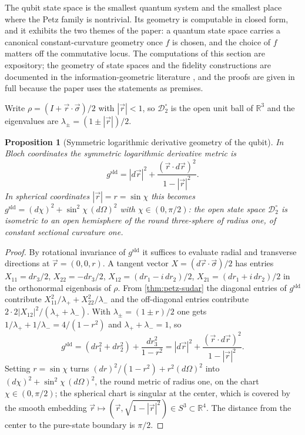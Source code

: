 \documentclass[11pt,letterpaper]{article}
\newtheorem{proposition}[theorem]{Proposition}
\theoremstyle{definition}
\theoremstyle{remark}
\begin{document}
The qubit state space is the smallest quantum system and the smallest place where the Petz family is nontrivial. Its geometry is computable in closed form, and it exhibits the two themes of the paper: a quantum state space carries a canonical constant-curvature geometry once $f$ is chosen, and the choice of $f$ matters off the commutative locus. The computations of this section are expository; the geometry of state spaces and the fidelity constructions are documented in the information-geometric literature \cite{hubner, braunstein-caves, petz-1996}, and the proofs are given in full because the paper uses the statements as premises.

Write $\rho = (I + \vec{r} \cdot \vec{\sigma})/2$ with $|\vec{r}| < 1$, so $\mathcal{D}_2^{\circ}$ is the open unit ball of $\mathbb{R}^3$ and the eigenvalues are $\lambda_{\pm} = (1 \pm |\vec{r}|)/2$.

\begin{proposition}[Symmetric logarithmic derivative geometry of the qubit]
\label{prop:qubit-sld}
In Bloch coordinates the symmetric logarithmic derivative metric is
\begin{equation}
\label{eq:qubit-sld}
g^{\mathrm{sld}} = |d\vec{r}|^2 + \frac{(\vec{r} \cdot d\vec{r})^2}{1 - |\vec{r}|^2}.
\end{equation}
In spherical coordinates $|\vec{r}| = r = \sin\chi$ this becomes $g^{\mathrm{sld}} = (d\chi)^2 + \sin^2\!\chi \, (d\Omega)^2$ with $\chi \in (0, \pi/2)$: the open state space $\mathcal{D}_2^{\circ}$ is isometric to an open hemisphere of the round three-sphere of radius one, of constant sectional curvature one.
\end{proposition}

\begin{proof}
By rotational invariance of $g^{\mathrm{sld}}$ it suffices to evaluate radial and transverse directions at $\vec{r} = (0, 0, r)$. A tangent vector $X = (d\vec{r} \cdot \vec{\sigma})/2$ has entries $X_{11} = dr_3/2$, $X_{22} = -dr_3/2$, $X_{12} = (dr_1 - i\, dr_2)/2$, $X_{21} = (dr_1 + i\, dr_2)/2$ in the orthonormal eigenbasis of $\rho$. From \cref{thm:petz-sudar} the diagonal entries of $g^{\mathrm{sld}}$ contribute $X_{11}^2 / \lambda_+ + X_{22}^2 / \lambda_-$ and the off-diagonal entries contribute $2 \cdot 2 |X_{12}|^2 / (\lambda_+ + \lambda_-)$. With $\lambda_{\pm} = (1 \pm r)/2$ one gets $1/\lambda_+ + 1/\lambda_- = 4/(1 - r^2)$ and $\lambda_+ + \lambda_- = 1$, so
\begin{equation}
g^{\mathrm{sld}} = (dr_1^2 + dr_2^2) + \frac{dr_3^2}{1 - r^2} = |d\vec{r}|^2 + \frac{(\vec{r} \cdot d\vec{r})^2}{1 - |\vec{r}|^2}.
\end{equation}
Setting $r = \sin\chi$ turns $(dr)^2/(1 - r^2) + r^2 (d\Omega)^2$ into $(d\chi)^2 + \sin^2\!\chi \, (d\Omega)^2$, the round metric of radius one, on the chart $\chi \in (0, \pi/2)$; the spherical chart is singular at the center, which is covered by the smooth embedding $\vec{r} \mapsto (\vec{r}, \sqrt{1 - |\vec{r}|^2}) \in S^3 \subset \mathbb{R}^4$. The distance from the center to the pure-state boundary is $\pi/2$.
\end{proof}
\end{document}
